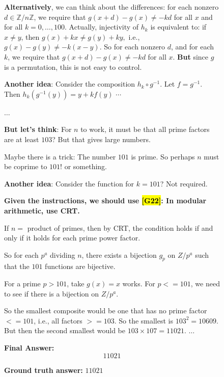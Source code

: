 \documentclass{article}
\theoremstyle{plain}
\theoremstyle{definition}
\theoremstyle{remark}
\begin{document}
\begin{figure}[!tb]
\begin{runcard}[title={Example of How E-SPL Shapes Model Behavior}]
\begin{runbox}[title={Model Output}]
\textbf{Alternatively}, we can think about the differences: for each nonzero \(d \in \mathbb{Z}/n\mathbb{Z}\), we require that
$
g(x+d) - g(x) \neq -k d
$
for all \(x\) and for all \(k=0,\ldots,100\). Actually, injectivity of \(h_k\) is equivalent to: if \(x \neq y\), then
$
g(x) + kx \neq g(y) + ky,
$
i.e., \(g(x)-g(y) \neq -k(x-y)\). So for each nonzero \(d\), and for each \(k\), we require that \(g(x+d) - g(x) \neq -k d\) for all \(x\). \textbf{But} since \(g\) is a permutation, this is not easy to control.

\textbf{Another idea}: Consider the composition \(h_k \circ g^{-1}\). Let \(f = g^{-1} \). Then \(h_k(g^{-1}(y)) = y + k f(y)\) $\cdots$

$\dots$

\textbf{But let's think}: For $n$ to work, it must be that all prime factors are at least $103$? But that gives large numbers.

{Maybe} there is a trick: The number $101$ is prime. So perhaps $n$ must be coprime to $101$! or something.

\textbf{Another idea}: Consider the function for $k=101$? Not required.

\medskip
{\color{Brown}\textbf{Given the instructions, we should use \hl{[G22]}: In modular arithmetic, use CRT.}}

If $n=$ product of primes, then by CRT, the condition holds if and only if it holds for each prime power factor.

So for each $p^a$ dividing $n$, there exists a bijection $g_p$ on $Z/p^a$ such that the $101$ functions are bijective.

For a prime $p > 101$, take $g(x)=x$ works. For $p <= 101$, we need to see if there is a bijection on $Z/p^a$.

So the smallest composite would be one that has no prime factor $<=101$, i.e., all factors $>=103$. So the smallest is $103^2=10609$. But then the second smallest would be $103\times 107=11021$. \quad $\dots$

\medskip
\textbf{Final Answer:} 
\[
\boxed{11021}
\]

\end{runbox}

\textbf{Ground truth answer:} $11021$
\end{runcard}
\label{tab:example-e-spl-1}

\end{figure}
\end{document}
